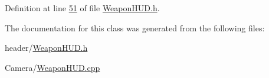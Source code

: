 Definition at line \hyperlink{_weapon_h_u_d_8h_source_l00051}{51} of file \hyperlink{_weapon_h_u_d_8h_source}{Weapon\+H\+U\+D.\+h}.



The documentation for this class was generated from the following files\+:\begin{DoxyCompactItemize}
\item 
header/\hyperlink{_weapon_h_u_d_8h}{Weapon\+H\+U\+D.\+h}\item 
Camera/\hyperlink{_weapon_h_u_d_8cpp}{Weapon\+H\+U\+D.\+cpp}\end{DoxyCompactItemize}
